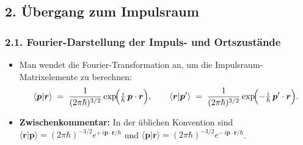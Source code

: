 \documentclass{scrartcl}
\begin{document}
\subsection*{2. Übergang zum Impulsraum}
\subsubsection*{2.1. Fourier-Darstellung der Impuls- und Ortszustände}
\begin{itemize}
  \item Man wendet die Fourier-Transformation an, um die Impulsraum-Matrixelemente zu berechnen:
  \[
    \langle \boldsymbol{p} \rvert \boldsymbol{r} \rangle
    \;=\;
    \frac{1}{(2\pi\hbar)^{3/2}}
    \exp\!\Bigl(\tfrac{i}{\hbar}\,\boldsymbol{p}\cdot\boldsymbol{r}\Bigr),
    \qquad
    \langle \boldsymbol{r} \rvert \boldsymbol{p}^{\prime} \rangle
    \;=\;
    \frac{1}{(2\pi\hbar)^{3/2}}
    \exp\!\Bigl(-\tfrac{i}{\hbar}\,\boldsymbol{p}^{\prime}\cdot\boldsymbol{r}\Bigr).
  \]
  \item \textbf{Zwischenkommentar:} 
    In der üblichen Konvention sind $\langle \boldsymbol{r}|\boldsymbol{p}\rangle = (2\pi\hbar)^{-3/2} e^{+\,i\boldsymbol{p}\cdot\boldsymbol{r}/\hbar}$ und $\langle \boldsymbol{p}|\boldsymbol{r}\rangle = (2\pi\hbar)^{-3/2} e^{-\,i\boldsymbol{p}\cdot\boldsymbol{r}/\hbar}$.
\end{itemize}
\end{document}
